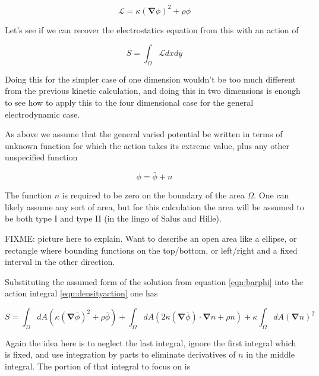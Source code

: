 \documentclass{article}
\newcommand{\LL}[0]{\mathcal{L}}
\newcommand{\spacegrad}[0]{\boldsymbol{\nabla}}
\begin{document}
\begin{equation*}
\LL = \kappa (\spacegrad \phi)^2 + \rho \phi
\end{equation*}

Let's see if we can recover the electrostatics equation from this with an action of

\begin{equation}\label{eqn:densityaction}
S = \int_{\Omega} \LL dx dy
\end{equation}

Doing this for the simpler case of one dimension wouldn't be too much different from the previous kinetic calculation, and doing this in two dimensions is enough
to see how to apply this to the four dimensional case for the general electrodynamic case.

As above we assume that the general varied potential be written in terms of unknown function for which the action takes its extreme value, plus any other unspecified
function

\begin{equation}\label{eqn:barphi}
\phi = \bar{\phi} + n
\end{equation}

The function $n$ is required to be zero on the boundary of the area $\Omega$.  One can likely assume any sort of area, but for this calculation
the area will be assumed to be both type I and type II (in the lingo of Salus and Hille).

FIXME: picture here to explain.  Want to describe an open area like a ellipse, or rectangle where bounding functions on the top/bottom, or left/right and a fixed interval 
in the other direction.


Substituting the assumed form of the solution from equation \ref{eqn:barphi} into the action integral \ref{eqn:densityaction} one has

\begin{equation*}
S = 
    \int_{\Omega} dA \left( \kappa {(\spacegrad \bar{\phi})}^2 + \rho \bar{\phi} \right)
+   \int_{\Omega} dA \left( 2 \kappa (\spacegrad \bar{\phi}) \cdot \spacegrad n + \rho n \right)
+   \kappa \int_{\Omega} dA {(\spacegrad n)}^2 
\end{equation*}

Again the idea here is to neglect the last integral, ignore the first integral which is fixed, and use integration by parts to eliminate derivatives of $n$
in the middle integral.  The portion of that integral to focus on is
\end{document}
